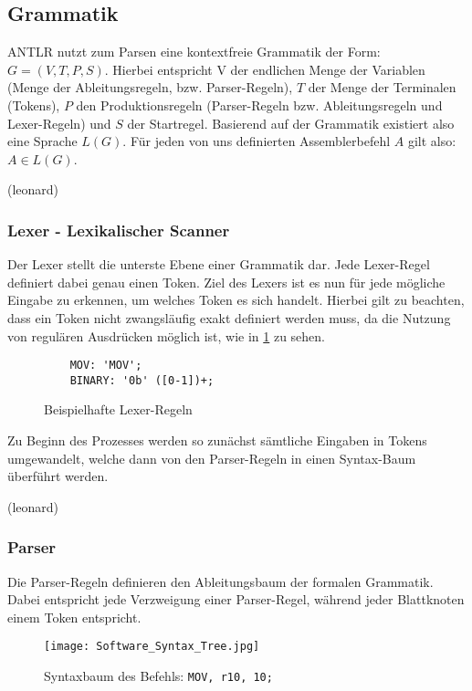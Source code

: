 \documentclass[paper=a4,fontsize=12pt,twocolumn]{scrreprt}
\begin{document}
\subsection{Grammatik}
\label{subsec:grammatik}
ANTLR nutzt zum Parsen eine kontextfreie Grammatik der Form: $G = (V, T, P, S)$.
Hierbei entspricht V der endlichen Menge der Variablen (Menge der Ableitungsregeln, bzw. Parser-Regeln), $T$ der Menge der Terminalen (Tokens), $P$ den Produktionsregeln (Parser-Regeln bzw. Ableitungsregeln und Lexer-Regeln) und $S$ der Startregel.
Basierend auf der Grammatik existiert also eine Sprache $L(G)$. Für jeden von uns definierten Assemblerbefehl $A$ gilt also: $A \in L(G)$. 

(leonard)

\subsubsection{Lexer - Lexikalischer Scanner}
Der Lexer stellt die unterste Ebene einer Grammatik dar.
Jede Lexer-Regel definiert dabei genau einen Token.
Ziel des Lexers ist es nun für jede mögliche Eingabe zu erkennen, um welches Token es sich handelt.
Hierbei gilt zu beachten, dass ein Token nicht zwangsläufig exakt definiert werden muss, da die Nutzung von regulären Ausdrücken möglich ist, wie in \ref{fig:Lexer_Commands} zu sehen.

\begin{figure}[h]
    \centering
    \begin{lstlisting}
    MOV: 'MOV';
    BINARY: '0b' ([0-1])+;
    \end{lstlisting}
    \caption{Beispielhafte Lexer-Regeln}
    \label{fig:Lexer_Commands}
\end{figure}

Zu Beginn des Prozesses werden so zunächst sämtliche Eingaben in Tokens umgewandelt, welche dann von den Parser-Regeln in einen Syntax-Baum überführt werden.

(leonard)

\subsubsection{Parser}
Die Parser-Regeln definieren den Ableitungsbaum der formalen Grammatik.
Dabei entspricht jede Verzweigung einer Parser-Regel, während jeder Blattknoten einem Token entspricht.

\begin{figure}[h]
\centering
\texttt{[image: Software\_Syntax\_Tree.jpg]}
\caption{Syntaxbaum des Befehls: \texttt{MOV, r10, 10;}}
\end{figure}
\end{document}
